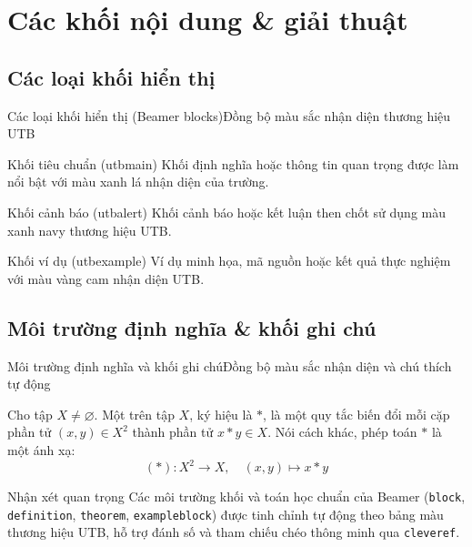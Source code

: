 \documentclass[aspectratio=43,10pt]{beamer}
\begin{document}
\section[Giải thuật]{Các khối nội dung \& giải thuật}
\subsection{Các loại khối hiển thị}
\begin{frame}{Các loại khối hiển thị (Beamer blocks)}{Đồng bộ màu sắc nhận diện thương hiệu UTB}
  \begin{block}{Khối tiêu chuẩn (utbmain)}
    Khối định nghĩa hoặc thông tin quan trọng được làm nổi bật với màu xanh lá nhận diện của trường.
  \end{block}

  \begin{alertblock}{Khối cảnh báo (utbalert)}
    Khối cảnh báo hoặc kết luận then chốt sử dụng màu xanh navy thương hiệu UTB.
  \end{alertblock}

  \begin{exampleblock}{Khối ví dụ (utbexample)}
    Ví dụ minh họa, mã nguồn hoặc kết quả thực nghiệm với màu vàng cam nhận diện UTB.
  \end{exampleblock}
\end{frame}

\subsection{Môi trường định nghĩa \& khối ghi chú}
\begin{frame}{Môi trường định nghĩa và khối ghi chú}{Đồng bộ màu sắc nhận diện và chú thích tự động}
  \begin{definition}
    Cho tập $X \neq \varnothing$. Một  trên tập $X$, ký hiệu là $*$, là một quy tắc biến đổi mỗi cặp phần tử $(x, y) \in X^2$ thành phần tử $x * y \in X$. Nói cách khác, phép toán $*$ là một ánh xạ:
    \[
      (*) : X^2 \longrightarrow X, \quad (x, y) \longmapsto x * y
    \]
  \end{definition}

  \begin{exampleblock}{Nhận xét quan trọng}
    \warning Các môi trường khối và toán học chuẩn của Beamer (\texttt{block}, \texttt{definition}, \texttt{theorem}, \texttt{exampleblock}) được tinh chỉnh tự động theo bảng màu thương hiệu UTB, hỗ trợ đánh số và tham chiếu chéo thông minh qua \texttt{cleveref}.
  \end{exampleblock}
\end{frame}
\end{document}
